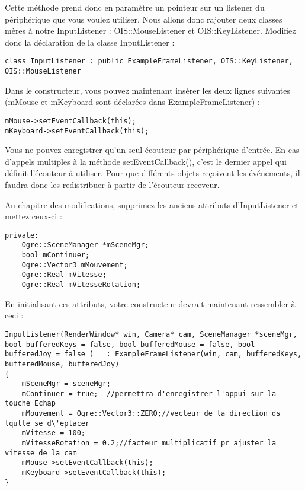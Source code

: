 Cette m\'ethode prend donc en param\`etre un pointeur sur un listener du p\'eriph\'erique que vous voulez utiliser. Nous allons donc rajouter deux classes m\`eres \`a notre InputListener : OIS::MouseListener et OIS::KeyListener. Modifiez donc la d\'eclaration de la classe InputListener :

\begin{lstlisting}[caption={Classes m\`eres pour gestion des Listeners}]
class InputListener : public ExampleFrameListener, OIS::KeyListener, OIS::MouseListener
\end{lstlisting}

Dans le constructeur, vous pouvez maintenant ins\'erer les deux lignes suivantes (mMouse et mKeyboard sont d\'eclar\'ees dans ExampleFrameListener) :

\begin{lstlisting}[caption={Enregistrement des listener}]
mMouse->setEventCallback(this);
mKeyboard->setEventCallback(this);
\end{lstlisting}

Vous ne pouvez enregistrer qu'un seul \'ecouteur par p\'eriph\'erique d'entr\'ee. En cas d'appels multiples \`a la m\'ethode setEventCallback(), c'est le dernier appel qui d\'efinit l'\'ecouteur \`a utiliser. Pour que diff\'erents objets re\c{c}oivent les \'ev\'enements, il faudra donc les redistribuer \`a partir de l'\'ecouteur receveur.

Au chapitre des modifications, supprimez les anciens attributs d'InputListener et mettez ceux-ci :

\begin{lstlisting}[caption={Attributs d'InputListener}]
private:
    Ogre::SceneManager *mSceneMgr;
    bool mContinuer;
    Ogre::Vector3 mMouvement;
    Ogre::Real mVitesse;
    Ogre::Real mVitesseRotation;
\end{lstlisting}

En initialisant ces attributs, votre constructeur devrait maintenant ressembler \`a ceci :

\begin{lstlisting}[caption={Constructeur d'InputListener}]
InputListener(RenderWindow* win, Camera* cam, SceneManager *sceneMgr, bool bufferedKeys = false, bool bufferedMouse = false, bool bufferedJoy = false )   : ExampleFrameListener(win, cam, bufferedKeys, bufferedMouse, bufferedJoy)
{
    mSceneMgr = sceneMgr;
    mContinuer = true;  //permettra d'enregistrer l'appui sur la touche Echap
    mMouvement = Ogre::Vector3::ZERO;//vecteur de la direction ds lqulle se d\'eplacer
    mVitesse = 100;
    mVitesseRotation = 0.2;//facteur multiplicatif pr ajuster la vitesse de la cam 
    mMouse->setEventCallback(this);
    mKeyboard->setEventCallback(this);
}
\end{lstlisting}

